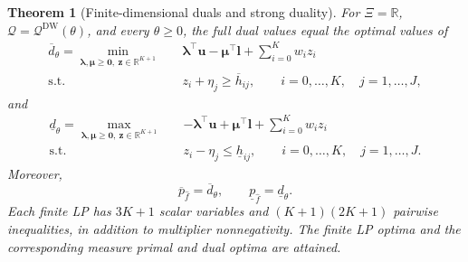 \documentclass[review,11pt,3p,authoryear,nopreprintline]{elsarticle}
\newtheorem{theorem}{Theorem}
\begin{document}
\begin{theorem}[Finite-dimensional duals and strong duality]
  \label{thm-finite-dual-reformulations}
  For $\Xi=\mathbb R$, $\mathscr Q=\mathscr Q^{\mathrm{DW}}(\theta)$, and every $\theta\ge0$, the full dual values equal the optimal values of
  \begin{equation}
    \begin{aligned}
      \overline d_\theta
      =\min_{\bm\lambda,\bm\mu\ge\bm 0,\ \bm z\in\mathbb R^{K+1}}\quad&
        \bm\lambda^\top\bm u-\bm\mu^\top\bm l+\sum_{i=0}^K w_i z_i\\
      \text{s.t.}\quad&
        z_i+\eta_j\ge\overline h_{ij},
        \qquad i=0,\ldots,K,\quad j=1,\ldots,J,
    \end{aligned}
    \label{eq-finite-upper-dual}
  \end{equation}
  and
  \begin{equation}
    \begin{aligned}
      \underline d_\theta
      =\max_{\bm\lambda,\bm\mu\ge\bm 0,\ \bm z\in\mathbb R^{K+1}}\quad&
        -\bm\lambda^\top\bm u+\bm\mu^\top\bm l+\sum_{i=0}^K w_i z_i\\
      \text{s.t.}\quad&
        z_i-\eta_j\le\underline h_{ij},
        \qquad i=0,\ldots,K,\quad j=1,\ldots,J.
    \end{aligned}
    \label{eq-finite-lower-dual}
  \end{equation}
  Moreover,
  \begin{equation}
    \overline p_{\hat f}=\overline d_\theta,\qquad
    \underline p_{\hat f}=\underline d_\theta.
    \label{eq-strong-duality}
  \end{equation}
  Each finite LP has $3K+1$ scalar variables and $(K+1)(2K+1)$ pairwise inequalities, in addition to multiplier nonnegativity. The finite LP optima and the corresponding measure primal and dual optima are attained.
\end{theorem}
\end{document}
